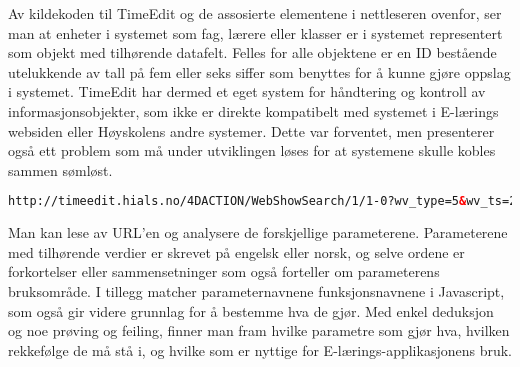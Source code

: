 \documentclass[../main.tex]{subfiles}
\begin{document}
Av kildekoden til TimeEdit og de assosierte elementene i nettleseren ovenfor, ser man at enheter i systemet som fag, lærere eller klasser er i systemet representert som objekt med tilhørende datafelt. Felles for alle objektene er en ID bestående utelukkende av tall på fem eller seks siffer som benyttes for å kunne gjøre oppslag i systemet. TimeEdit har dermed et eget system for håndtering og kontroll av informasjonsobjekter, som ikke er direkte kompatibelt med systemet i E-lærings websiden eller Høyskolens andre systemer. Dette var forventet, men presenterer også ett problem som må under utviklingen løses for at systemene skulle kobles sammen sømløst. 

\begin{lstlisting}[language=HTML, frame=single, caption={En URL generert når man søker etter en timeplan for ett spesifikt fag}]
http://timeedit.hials.no/4DACTION/WebShowSearch/1/1-0?wv_type=5&wv_ts=20130511T191704X3729&wv_search=&wv_startWeek=1301&wv_stopWeek=1318&wv_first=0&wv_addObj=&wv_delObj=&wv_obj1=174000&wv_text=Tekstformat
\end{lstlisting}

Man kan lese av URL’en og analysere de forskjellige parameterene. Parameterene med tilhørende verdier er skrevet på engelsk eller norsk, og selve ordene er forkortelser eller sammensetninger som også forteller om parameterens bruksområde.  I tillegg matcher parameternavnene funksjonsnavnene i Javascript, som også gir videre grunnlag for å bestemme hva de gjør. Med enkel deduksjon og noe prøving og feiling, finner man fram hvilke parametre som gjør hva, hvilken rekkefølge de må stå i, og hvilke som er nyttige for E-lærings-applikasjonens bruk.
\end{document}
